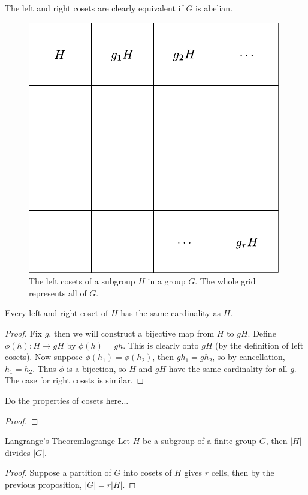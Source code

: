 \documentclass[10pt]{report}
\begin{document}
The left and right cosets are clearly equivalent if $G$ is abelian.

\begin{figure}[H]
	\centering
	\includegraphics[scale=0.8]{fig/cosets.pdf}
	\caption{The left cosets of a subgroup $H$ in a group $G$. The whole grid represents all of $G$.}
\end{figure}


\begin{prop}
	Every left and right coset of $H$ has the same cardinality as $H$.
\end{prop}
\begin{proof}
	Fix $g$, then we will construct a bijective map from $H$ to $gH$. Define $\phi(h):H\to gH$ by $\phi(h)=gh$. This is clearly onto $gH$ (by the definition of left cosets). Now suppose $\phi(h_1)=\phi(h_2)$, then $gh_1=gh_2$, so by cancellation, $h_1=h_2$. Thus $\phi$ is a bijection, so $H$ and $gH$ have the same cardinality for all $g$. The case for right cosets is similar.
\end{proof}

\begin{prop}
{\color{red}Do the properties of cosets here...}
\end{prop}
\begin{proof}
\end{proof}

\begin{thrm}{Langrange's Theorem}{lagrange}
	Let $H$ be a subgroup of a finite group $G$, then $|H|$ divides $|G|$.
\end{thrm}
\begin{proof}
Suppose a partition of $G$ into cosets of $H$ gives $r$ cells, then by the previous proposition, $|G| = r |H|$.
\end{proof}
\end{document}
